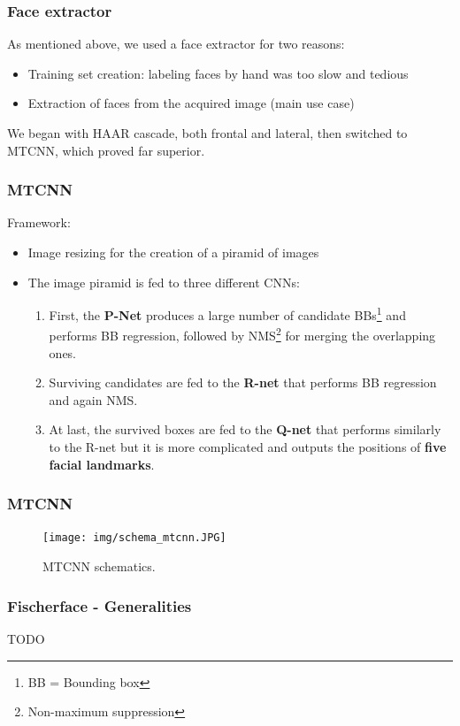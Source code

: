 \documentclass{beamer}
\begin{document}
	\begin{frame}
		\frametitle{Face extractor}
		As mentioned above, we used a face extractor for two reasons:
		\begin{itemize}
			\item Training set creation: labeling faces by hand was too slow and tedious
			\item Extraction of faces from the acquired image (main use case)
		\end{itemize}
		We began with HAAR cascade, both frontal and lateral, then switched to MTCNN, which proved far superior.
	\end{frame}
	
	\begin{frame}
		\frametitle{MTCNN}
		Framework:
		\begin{itemize}
			\item Image resizing for the creation of a piramid of images
			\item The image piramid is fed to three different CNNs:
			\begin{enumerate}
				\item First, the \textbf{P-Net} produces a large number of candidate BBs\footnote{BB = Bounding box} and performs BB regression, followed by NMS\footnote{Non-maximum suppression} for merging the overlapping ones.
				\item Surviving candidates are fed to the \textbf{R-net} that performs BB regression and again NMS.
				\item At last, the survived boxes are fed to the \textbf{Q-net} that performs similarly to the R-net but it is more complicated and outputs the positions of \textbf{five facial landmarks}.
			\end{enumerate}
		\end{itemize}
	\end{frame}
	
	\begin{frame}
		\frametitle{MTCNN}
		\begin{figure}
			\centering
			\texttt{[image: img/schema\_mtcnn.JPG]}
    		\caption{MTCNN schematics.}
    		\label{fig:schema_mtcnn}
		\end{figure}
	\end{frame}
	
	\begin{frame}
		\frametitle{Fischerface - Generalities}
		TODO
	\end{frame}
	
\end{document}
